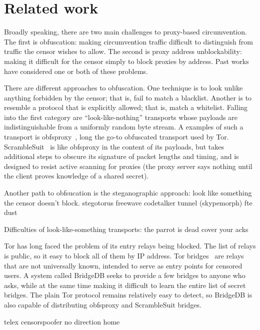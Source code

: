 \documentclass{article}
\begin{document}

\section{Related work}

Broadly speaking, there are two main challenges to proxy-based circumvention.
The first is obfuscation: making circumvention traffic difficult to distinguish
from traffic the censor wishes to allow.
The second is proxy address unblockability: making it difficult for
the censor simply to block proxies by address.
Past works have considered one or both of these problems.

There are different approaches to obfuscation.
One technique is to look unlike anything forbidden by the censor; that is, fail to match a blacklist.
Another is to resemble a protocol that is explicitly allowed; that is, match a whitelist.
Falling into the first category are ``look-like-nothing'' transports
whose payloads are indistinguishable from a uniformly random byte stream.
A examples of such a transport is obfsproxy~\cite{obfsproxy},
long the go-to obfuscated transport used by Tor.
ScrambleSuit~\cite{scramblesuit} is like obfsproxy in the content of its payloads,
but takes additional steps to obscure its signature of packet lengths and timing,
and is designed to resist active scanning for proxies
(the proxy server says nothing until the client proves knowledge of a shared secret).

Another path to obfsucation is the steganographic approach:
look like something the censor doesn't block.
stegotorus
freewave
codetalker tunnel (skypemorph)
fte
dust

Difficulties of look-like-something transports:
the parrot is dead
cover your acks

Tor has long faced the problem of its entry relays being blocked.
The list of relays is public, so it easy to block all of them by IP address.
Tor bridges~\cite{tor-blocking} are relays that are not universally known,
intended to serve as entry points for censored users.
A system called BridgeDB seeks to provide a few bridges to anyone who asks,
while at the same time making it difficult to learn the entire list of secret bridges.
The plain Tor protocol remains relatively easy to detect,
so BridgeDB is also capable of distributing obfsproxy and ScrambleSuit bridges.

telex
censorspoofer
no direction home
\end{document}
